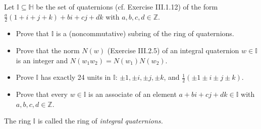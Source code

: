 \documentclass[../../master.tex]{subfiles}
\begin{document}
\begin{problem}
    Let $\mathbb{I} \subseteq \mathbb{H}$ be the set of quaternions (cf. Exercise III.1.12) of the form $\frac{a}{2} (1 + i + j + k) + bi + cj + dk$ with $a, b, c, d \in \mathbb{Z}$.
    \begin{itemize}
        \item Prove that $\mathbb{I}$ is a (noncommutative) subring of the ring of quaternions.
        \item Prove that the norm $N(w)$ (Exercise III.2.5) of an integral quaternion $w \in \mathbb{I}$ is an integer and $N(w_1 w_2) = N(w_1) N(w_2)$.
        \item Prove $\mathbb{I}$ has exactly 24 units in $\mathbb{I}$:
            $\pm 1, \pm i, \pm j, \pm k$, and $\frac{1}{2} (\pm 1 \pm i \pm j \pm k)$.
        \item Prove that every $w \in \mathbb{I}$ is an associate of an element $a + bi + cj + dk \in \mathbb{I}$ with $a, b, c, d \in \mathbb{Z}$.
    \end{itemize}
    The ring $\mathbb{I}$ is called the ring of \textit{integral quaternions.}
\end{problem}
\end{document}
